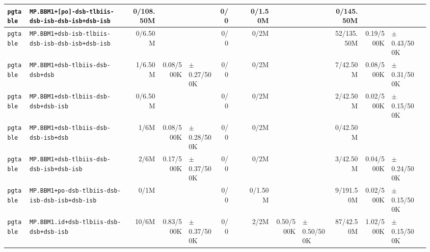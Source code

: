 \begin{tabular}{l l  | r r l | r r l | r r l | r r l l}
        \verb|pgtable| &      \verb|MP.BBM1+[po]-dsb-tlbiis-dsb-isb-dsb-isb+dsb-isb| &      0/108.50M &                       &                   &            0/0 &                       &  &        0/1.50M &                       &                   &      0/145.50M &                       &                    & \\ \hline 
        \verb|pgtable| &       \verb|MP.BBM1+dsb-isb-tlbiis-dsb-isb-dsb-isb+dsb-isb| &        0/6.50M &                       &                   &            0/0 &                       &  &           0/2M &                       &                   &     52/135.50M &             0.19/500K &    $\pm$ 0.43/500K & \\ \hline 
        \verb|pgtable| &                       \verb|MP.BBM1+dsb-tlbiis-dsb-dsb+dsb| &        1/6.50M &             0.08/500K &   $\pm$ 0.27/500K &            0/0 &                       &  &           0/2M &                       &                   &       7/42.50M &             0.08/500K &    $\pm$ 0.31/500K & \\ \hline 
        \verb|pgtable| &                   \verb|MP.BBM1+dsb-tlbiis-dsb-dsb+dsb-isb| &        0/6.50M &                       &                   &            0/0 &                       &  &           0/2M &                       &                   &       2/42.50M &             0.02/500K &    $\pm$ 0.15/500K & \\ \hline 
        \verb|pgtable| &                   \verb|MP.BBM1+dsb-tlbiis-dsb-dsb-isb+dsb| &           1/6M &             0.08/500K &   $\pm$ 0.28/500K &            0/0 &                       &  &           0/2M &                       &                   &       0/42.50M &                       &                    & \\ \hline 
        \verb|pgtable| &               \verb|MP.BBM1+dsb-tlbiis-dsb-dsb-isb+dsb-isb| &           2/6M &             0.17/500K &   $\pm$ 0.37/500K &            0/0 &                       &  &           0/2M &                       &                   &       3/42.50M &             0.04/500K &    $\pm$ 0.24/500K & \\ \hline 
        \verb|pgtable| &        \verb|MP.BBM1+po-dsb-tlbiis-dsb-isb-dsb-isb+dsb-isb| &           0/1M &                       &                   &            0/0 &                       &  &        0/1.50M &                       &                   &      9/191.50M &             0.02/500K &    $\pm$ 0.15/500K & \\ \hline 
        \verb|pgtable| &                \verb|MP.BBM1.id+dsb-tlbiis-dsb-dsb+dsb-isb| &          10/6M &             0.83/500K &   $\pm$ 0.37/500K &            0/0 &                       &  &           2/2M &             0.50/500K &   $\pm$ 0.50/500K &      87/42.50M &             1.02/500K &    $\pm$ 0.15/500K & \\ \hline 

\end{tabular}
